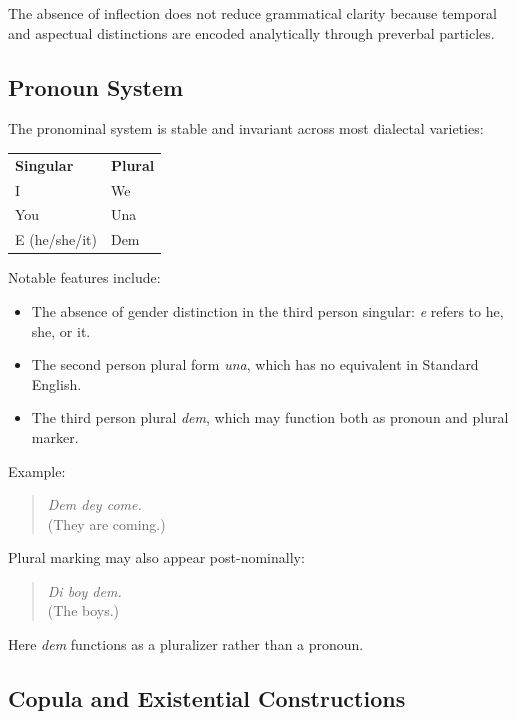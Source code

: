 \documentclass[12pt]{article}
\begin{document}
The absence of inflection does not reduce grammatical clarity because temporal and aspectual distinctions are encoded analytically through preverbal particles.

\subsection{Pronoun System}

The pronominal system is stable and invariant across most dialectal varieties:

\begin{center}
\begin{tabular}{ll}
\textbf{Singular} & \textbf{Plural} \\
I & We \\
You & Una \\
E (he/she/it) & Dem \\
\end{tabular}
\end{center}

Notable features include:

\begin{itemize}
\item The absence of gender distinction in the third person singular: \textit{e} refers to he, she, or it.
\item The second person plural form \textit{una}, which has no equivalent in Standard English.
\item The third person plural \textit{dem}, which may function both as pronoun and plural marker.
\end{itemize}

Example:

\begin{quote}
\textit{Dem dey come.} \\
(They are coming.)
\end{quote}

Plural marking may also appear post-nominally:

\begin{quote}
\textit{Di boy dem.} \\
(The boys.)
\end{quote}

Here \textit{dem} functions as a pluralizer rather than a pronoun.

\subsection{Copula and Existential Constructions}
\end{document}

